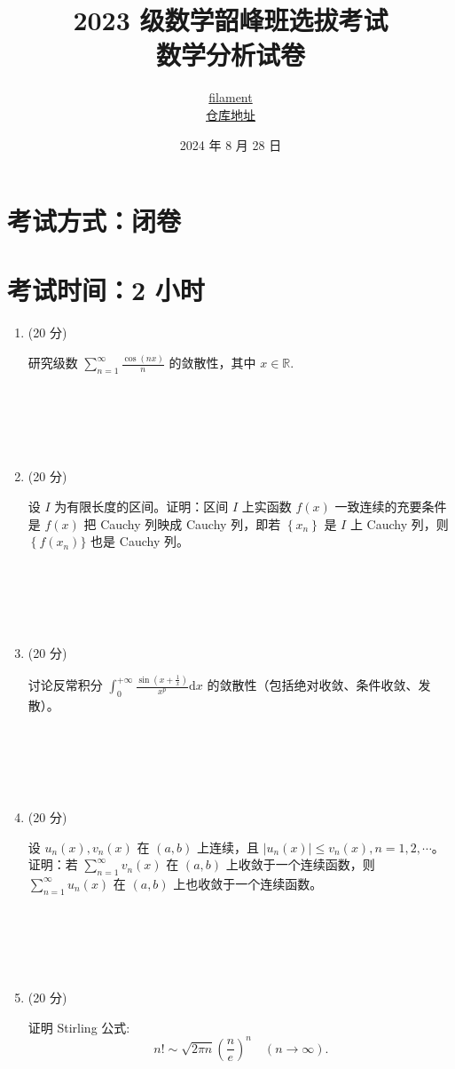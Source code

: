 \documentclass{article}
\title{\textbf{2023 级数学韶峰班选拔考试 \\ 数学分析试卷 }}
\author{ \href{https://github.com/Unconnectable}{filament} \\ \href{https://github.com/Unconnectable/XTU_MATH}{仓库地址}}
\date{2024 年 8 月 28 日}
\begin{document}
\maketitle

\section*{考试方式：闭卷}
\section*{考试时间：2 小时}

\begin{enumerate}
    \item (20 分) 
    \begin{tcolorbox}[colframe=blue!50!black, colback=blue!5!white]
    研究级数 $\sum_{n=1}^{\infty} \frac{\cos(n x)}{n}$ 的敛散性，其中 $x \in \mathbb{R}$.
    \end{tcolorbox} \\\\\\\\
    
    \item (20 分) 
    \begin{tcolorbox}[colframe=green!50!black, colback=green!5!white]
    设 $I$ 为有限长度的区间。证明：区间 $I$ 上实函数 $f(x)$ 一致连续的充要条件是 $f(x)$ 把 Cauchy 列映成 Cauchy 列，即若 $\left\{x_{n}\right\}$ 是 $I$ 上 Cauchy 列，则 $\left\{f\left(x_{n}\right)\}$ 也是 Cauchy 列。
    \end{tcolorbox} \\\\\\\\
    
    \item (20 分) 
    \begin{tcolorbox}[colframe=red!50!black, colback=red!5!white]
    讨论反常积分 $\int_{0}^{+\infty} \frac{\sin \left(x+\frac{1}{x}\right)}{x^{p}} \mathrm{d}x$ 的敛散性（包括绝对收敛、条件收敛、发散）。
    \end{tcolorbox} \\\\\\\\
    
    \item (20 分) 
    \begin{tcolorbox}[colframe=purple!50!black, colback=purple!5!white]
    设 $u_{n}(x), v_{n}(x)$ 在 $(a, b)$ 上连续，且 $\left|u_{n}(x)\right| \leq v_{n}(x), n=1,2, \cdots$。证明：若 $\sum_{n=1}^{\infty} v_{n}(x)$ 在 $(a, b)$ 上收敛于一个连续函数，则 $\sum_{n=1}^{\infty} u_{n}(x)$ 在 $(a, b)$ 上也收敛于一个连续函数。
    \end{tcolorbox} \\\\\\\\
    
    \item (20 分) 
    \begin{tcolorbox}[colframe=orange!50!black, colback=orange!5!white]
    证明 Stirling 公式: 
    \[
    n! \sim \sqrt{2 \pi n}\left(\frac{n}{e}\right)^{n} \quad (n \to \infty).
    \]
    \end{tcolorbox}
\end{enumerate}
\end{document}
